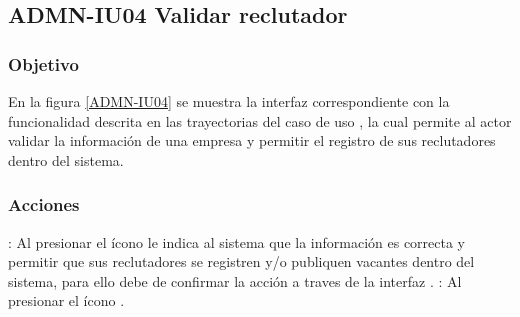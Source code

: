 \clearpage
\subsection{ADMN-IU04 Validar reclutador}

\subsubsection{Objetivo}
En la figura \ref{ADMN-IU04} se muestra la interfaz correspondiente con la funcionalidad descrita en las trayectorias del caso de uso , 
la cual permite al actor validar la información de una empresa y permitir el registro de sus reclutadores dentro del sistema.

\subsubsection{Acciones}
\Titem \IUAprobarE{} : Al presionar el ícono le indica al sistema que la información es correcta y permitir que sus reclutadores se registren y/o publiquen vacantes dentro del sistema, para ello debe de confirmar la acción a traves de la interfaz .
\Titem \IUDescartar{} : Al presionar el ícono .

  


\clearpage
